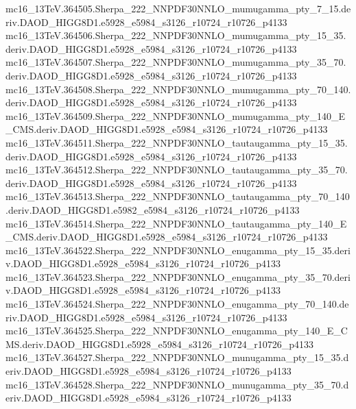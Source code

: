 \begin{scriptsize}
mc16\_13TeV.364505.Sherpa\_222\_NNPDF30NNLO\_mumugamma\_pty\_7\_15.deriv.DAOD\_HIGG8D1.e5928\_e5984\_s3126\_r10724\_r10726\_p4133 \\
mc16\_13TeV.364506.Sherpa\_222\_NNPDF30NNLO\_mumugamma\_pty\_15\_35.deriv.DAOD\_HIGG8D1.e5928\_e5984\_s3126\_r10724\_r10726\_p4133 \\
mc16\_13TeV.364507.Sherpa\_222\_NNPDF30NNLO\_mumugamma\_pty\_35\_70.deriv.DAOD\_HIGG8D1.e5928\_e5984\_s3126\_r10724\_r10726\_p4133 \\
mc16\_13TeV.364508.Sherpa\_222\_NNPDF30NNLO\_mumugamma\_pty\_70\_140.deriv.DAOD\_HIGG8D1.e5928\_e5984\_s3126\_r10724\_r10726\_p4133 \\
mc16\_13TeV.364509.Sherpa\_222\_NNPDF30NNLO\_mumugamma\_pty\_140\_E\_CMS.deriv.DAOD\_HIGG8D1.e5928\_e5984\_s3126\_r10724\_r10726\_p4133 \\
mc16\_13TeV.364511.Sherpa\_222\_NNPDF30NNLO\_tautaugamma\_pty\_15\_35.deriv.DAOD\_HIGG8D1.e5928\_e5984\_s3126\_r10724\_r10726\_p4133 \\
mc16\_13TeV.364512.Sherpa\_222\_NNPDF30NNLO\_tautaugamma\_pty\_35\_70.deriv.DAOD\_HIGG8D1.e5928\_e5984\_s3126\_r10724\_r10726\_p4133 \\
mc16\_13TeV.364513.Sherpa\_222\_NNPDF30NNLO\_tautaugamma\_pty\_70\_140.deriv.DAOD\_HIGG8D1.e5982\_e5984\_s3126\_r10724\_r10726\_p4133 \\
mc16\_13TeV.364514.Sherpa\_222\_NNPDF30NNLO\_tautaugamma\_pty\_140\_E\_CMS.deriv.DAOD\_HIGG8D1.e5928\_e5984\_s3126\_r10724\_r10726\_p4133 \\
mc16\_13TeV.364522.Sherpa\_222\_NNPDF30NNLO\_enugamma\_pty\_15\_35.deriv.DAOD\_HIGG8D1.e5928\_e5984\_s3126\_r10724\_r10726\_p4133 \\
mc16\_13TeV.364523.Sherpa\_222\_NNPDF30NNLO\_enugamma\_pty\_35\_70.deriv.DAOD\_HIGG8D1.e5928\_e5984\_s3126\_r10724\_r10726\_p4133 \\
mc16\_13TeV.364524.Sherpa\_222\_NNPDF30NNLO\_enugamma\_pty\_70\_140.deriv.DAOD\_HIGG8D1.e5928\_e5984\_s3126\_r10724\_r10726\_p4133 \\
mc16\_13TeV.364525.Sherpa\_222\_NNPDF30NNLO\_enugamma\_pty\_140\_E\_CMS.deriv.DAOD\_HIGG8D1.e5928\_e5984\_s3126\_r10724\_r10726\_p4133 \\
mc16\_13TeV.364527.Sherpa\_222\_NNPDF30NNLO\_munugamma\_pty\_15\_35.deriv.DAOD\_HIGG8D1.e5928\_e5984\_s3126\_r10724\_r10726\_p4133 \\
mc16\_13TeV.364528.Sherpa\_222\_NNPDF30NNLO\_munugamma\_pty\_35\_70.deriv.DAOD\_HIGG8D1.e5928\_e5984\_s3126\_r10724\_r10726\_p4133 \\

\end{scriptsize}
